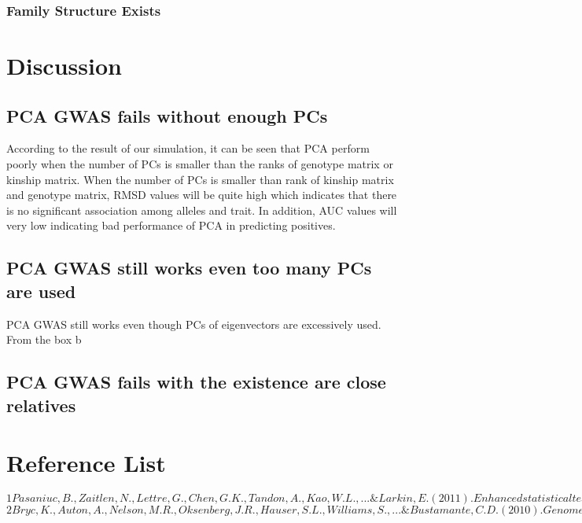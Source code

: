 \documentclass[12pt]{article}
\theoremstyle{definition}
\theoremstyle{plain}
\begin{document}
 \subsubsection{Family Structure Exists}


\section{Discussion}
\subsection{PCA GWAS fails without enough PCs}
According to the result of our simulation, it can be seen that PCA perform poorly when the number of PCs is smaller than the ranks of genotype matrix or kinship matrix. When the number of PCs is smaller than rank of kinship matrix and genotype matrix, RMSD values will be quite high which indicates that there is no significant association among alleles and trait. In addition, AUC values will very low indicating bad performance of PCA in predicting positives. 
\subsection{PCA GWAS still works even too many PCs are used}
PCA GWAS still works even though PCs of eigenvectors are excessively used. From the box b



\subsection{PCA GWAS fails with the existence are close relatives }



\section{Reference List}
$
1
Pasaniuc, B., Zaitlen, N., Lettre, G., Chen, G. K., Tandon, A., Kao, W. L., ... \& Larkin, E. (2011). Enhanced statistical tests for GWAS in admixed populations: assessment using African Americans from CARe and a Breast Cancer Consortium. PLoS genetics, 7(4), e1001371.
$\\

$
2
Bryc, K., Auton, A., Nelson, M. R., Oksenberg, J. R., Hauser, S. L., Williams, S., ... \& Bustamante, C. D. (2010). Genome-wide patterns of population structure and admixture in West Africans and African Americans. Proceedings of the National Academy of Sciences, 107(2), 786-791.
$\\
\end{document}
